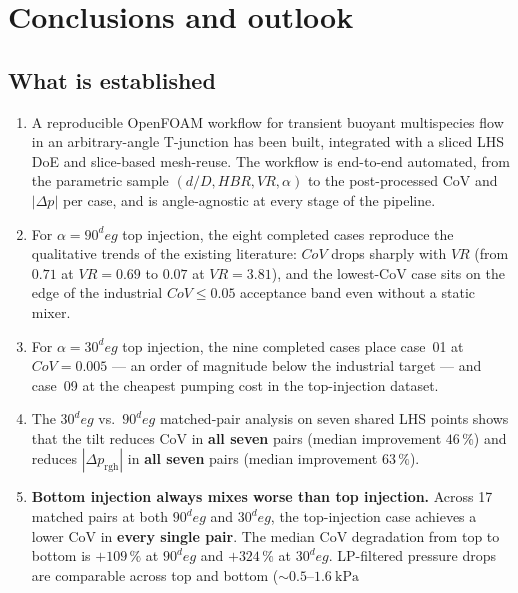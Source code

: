 \documentclass[11pt,a4paper]{article}
\def\dD{d/D}%
\def\VR{VR}%
\def\HBR{HBR}%
\def\CoV{CoV}%
\def\circ{ deg}%
\newcommand{\dD}{\ensuremath{d/D}}
\newcommand{\VR}{\ensuremath{\mathrm{VR}}}
\newcommand{\HBR}{\ensuremath{\mathrm{HBR}}}
\newcommand{\CoV}{\ensuremath{\mathrm{CoV}}}
\begin{document}

\section{Conclusions and outlook}
\label{sec:concl}

\subsection{What is established}
\begin{enumerate}
    \item A reproducible OpenFOAM workflow for transient buoyant
    multispecies flow in an arbitrary-angle T-junction has been
    built, integrated with a sliced LHS DoE and slice-based
    mesh-reuse. The workflow is end-to-end automated, from the
    parametric sample \((\dD,\HBR,\VR,\alpha)\) to the
    post-processed \CoV{} and \(|\Delta p|\) per case, and is
    angle-agnostic at every stage of the pipeline.
    \item For \(\alpha=90^\circ\) top injection, the eight completed
    cases reproduce the qualitative trends of the existing
    literature: \(\CoV\) drops sharply with \(\VR\) (from \(0.71\)
    at \(\VR=0.69\) to \(0.07\) at \(\VR=3.81\)), and the
    lowest-\CoV{} case sits on the edge of the industrial
    \(\CoV \le 0.05\) acceptance band even without a static mixer.
    \item For \(\alpha=30^\circ\) top injection, the nine completed
    cases place case~01 at \(\CoV=0.005\) --- an order of magnitude
    below the industrial target --- and case~09 at the cheapest
    pumping cost in the top-injection dataset.
    \item The \(30^\circ\) vs.\ \(90^\circ\) matched-pair analysis
    on seven shared LHS points shows that the tilt reduces \CoV{} in
    \textbf{all seven} pairs (median improvement \(46\,\%\)) and
    reduces \(|\Delta p_{\mathrm{rgh}}|\) in \textbf{all seven}
    pairs (median improvement \(63\,\%\)).
    \item \textbf{Bottom injection always mixes worse than top
    injection.} Across 17 matched pairs at both \(90^\circ\) and
    \(30^\circ\), the top-injection case achieves a lower \CoV{} in
    \textbf{every single pair}. The median \CoV{} degradation from
    top to bottom is \(+109\,\%\) at \(90^\circ\) and
    \(+324\,\%\) at \(30^\circ\). LP-filtered pressure drops are
    comparable across top and bottom (\(\sim 0.5\)--\(\SI{1.6}{\kilo\pascal}\)

\end{enumerate}
\end{document}
